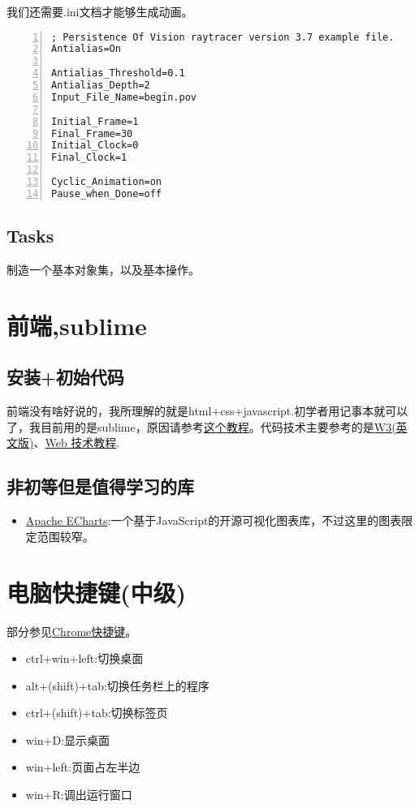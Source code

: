 \documentclass[11pt]{amsart}
\begin{document}
我们还需要.ini文档才能够生成动画。
\begin{lstlisting}[numbers=left,numberstyle=\tiny,numbersep=10pt]
; Persistence Of Vision raytracer version 3.7 example file.
Antialias=On

Antialias_Threshold=0.1
Antialias_Depth=2
Input_File_Name=begin.pov

Initial_Frame=1
Final_Frame=30
Initial_Clock=0
Final_Clock=1

Cyclic_Animation=on
Pause_when_Done=off
\end{lstlisting}
\subsection{Tasks}
制造一个基本对象集，以及基本操作。
\section{前端,sublime}
\subsection{安装+初始代码}
前端没有啥好说的，我所理解的就是html+css+javascript.初学者用记事本就可以了，我目前用的是sublime，原因请参考\href{https://www.bilibili.com/video/BV1vx411z7rb}{这个教程}。代码技术主要参考的是\href{https://www.quanzhanketang.com/}{W3(英文版)}、\href{http://www.w3school.com.cn/}{Web 技术教程}.
\subsection{非初等但是值得学习的库}
\begin{itemize}
\item \href{https://echarts.apache.org/zh/index.html}{Apache ECharts}:一个基于JavaScript的开源可视化图表库，不过这里的图表限定范围较窄。
\end{itemize}
\section{电脑快捷键(中级)}
部分参见\href{https://zhuanlan.zhihu.com/p/42281412}{Chrome快捷键}。
\begin{itemize}
	\item  ctrl+win+left:切换桌面
	\item  alt+(shift)+tab:切换任务栏上的程序
	\item  ctrl+(shift)+tab:切换标签页
	\item  win+D:显示桌面
	\item  win+left:页面占左半边
	\item  win+R:调出运行窗口
\end{itemize} 
\end{document}
